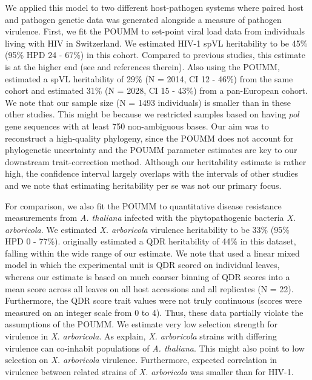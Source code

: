 \documentclass[11pt]{article}
\begin{document}
\begin{linenumbers}
We applied this model to two different host-pathogen systems where paired host and pathogen genetic data was generated alongside a measure of pathogen virulence. First, we fit the POUMM to set-point viral load data from individuals living with HIV in Switzerland. We estimated HIV-1 spVL heritability to be 45\% (95\% HPD 24 - 67\%) in this cohort. Compared to previous studies, this estimate is at the higher end (see \citet{Mitov2018} and references therein). Also using the POUMM, \citet{Bertels2018} estimated a spVL heritability of 29\% (N = 2014, CI 12 - 46\%) from the same cohort and \citet{Blanquart2017} estimated 31\% (N = 2028, CI 15 - 43\%) from a pan-European cohort. We note that our sample size (N = 1493 individuals) is smaller than in these other studies. This might be because we restricted samples based on having $pol$ gene sequences with at least 750 non-ambiguous bases. Our aim was to reconstruct a high-quality phylogeny, since the POUMM does not account for phylogenetic uncertainty and the POUMM parameter estimates are key to our downstream trait-correction method. Although our heritability estimate is rather high, the confidence interval largely overlaps with the intervals  of other studies and we note that estimating heritability per se was not our primary focus.

For comparison, we also fit the POUMM to quantitative disease resistance measurements from \emph{A. thaliana} infected with the phytopathogenic bacteria \emph{X. arboricola}. We estimated \emph{X. arboricola} virulence heritability to be 33\% (95\% HPD 0 - 77\%). \citep{Wang2018Two-wayGenomes} originally estimated a QDR heritability of 44\% in this dataset, falling within the wide range of our estimate. We note that \cite{Wang2018Two-wayGenomes} used a linear mixed model in which the experimental unit is QDR scored on individual leaves, whereas our estimate is based on much coarser binning of QDR scores into a mean score across all leaves on all host accessions and all replicates (N = 22). Furthermore, the QDR score trait values were not truly continuous (scores were measured on an integer scale from 0 to 4). Thus, these data partially violate the assumptions of the POUMM. We estimate very low selection strength for virulence in \emph{X. arboricola}. As \cite{Wang2018Two-wayGenomes} explain, \emph{X. arboricola} strains with differing virulence can co-inhabit populations of \emph{A. thaliana}. This might also point to low selection on \emph{X. arboricola} virulence. Furthermore, expected correlation in virulence between related strains of \emph{X. arboricola} was smaller than for HIV-1.


\end{linenumbers}
\end{document}
